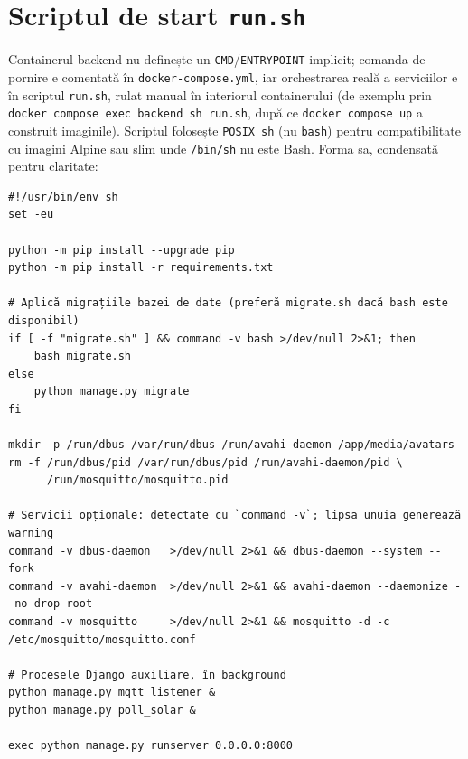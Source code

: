 \section{Scriptul de start \texttt{run.sh}}
Containerul backend nu definește un \texttt{CMD}/\texttt{ENTRYPOINT} implicit; comanda de pornire e comentată în \texttt{docker-compose.yml}, iar orchestrarea reală a serviciilor e în scriptul \texttt{run.sh}, rulat manual în interiorul containerului (de exemplu prin \texttt{docker compose exec backend sh run.sh}, după ce \texttt{docker compose up} a construit imaginile). Scriptul folosește \texttt{POSIX sh} (nu \texttt{bash}) pentru compatibilitate cu imagini Alpine sau slim unde \texttt{/bin/sh} nu este Bash. Forma sa, condensată pentru claritate:
\begin{verbatim}
#!/usr/bin/env sh
set -eu

python -m pip install --upgrade pip
python -m pip install -r requirements.txt

# Aplică migrațiile bazei de date (preferă migrate.sh dacă bash este disponibil)
if [ -f "migrate.sh" ] && command -v bash >/dev/null 2>&1; then
    bash migrate.sh
else
    python manage.py migrate
fi

mkdir -p /run/dbus /var/run/dbus /run/avahi-daemon /app/media/avatars
rm -f /run/dbus/pid /var/run/dbus/pid /run/avahi-daemon/pid \
      /run/mosquitto/mosquitto.pid

# Servicii opționale: detectate cu `command -v`; lipsa unuia generează warning
command -v dbus-daemon   >/dev/null 2>&1 && dbus-daemon --system --fork
command -v avahi-daemon  >/dev/null 2>&1 && avahi-daemon --daemonize --no-drop-root
command -v mosquitto     >/dev/null 2>&1 && mosquitto -d -c /etc/mosquitto/mosquitto.conf

# Procesele Django auxiliare, în background
python manage.py mqtt_listener &
python manage.py poll_solar &

exec python manage.py runserver 0.0.0.0:8000
\end{verbatim}

